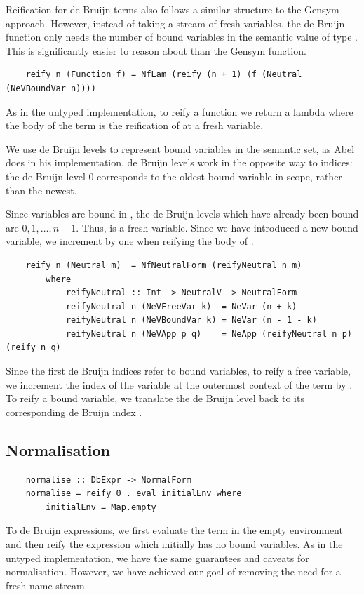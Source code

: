 Reification for de Bruijn terms also follows a similar structure to the Gensym approach. However, instead of taking a stream of fresh variables, the de Bruijn  function only needs the number of bound variables in the semantic value of type . This is significantly easier to reason about than the Gensym  function.

\begin{lstlisting}
    reify n (Function f) = NfLam (reify (n + 1) (f (Neutral (NeVBoundVar n))))
\end{lstlisting}

As in the untyped implementation, to reify a function  we return a lambda where the body of the term is the reification of  at a fresh variable.

We use de Bruijn levels to represent bound variables in the semantic set, as Abel does in his implementation. de Bruijn levels work in the opposite way to indices: the de Bruijn level 0 corresponds to the oldest bound variable in scope, rather than the newest. 

Since  variables are bound in , the de Bruijn levels which have already been bound are $0, 1, \dots, n - 1$. Thus,  is a fresh variable. Since we have introduced a new bound variable, we increment  by one when reifying the body of .

\begin{lstlisting}
    reify n (Neutral m)  = NfNeutralForm (reifyNeutral n m)
        where
            reifyNeutral :: Int -> NeutralV -> NeutralForm
            reifyNeutral n (NeVFreeVar k)  = NeVar (n + k)
            reifyNeutral n (NeVBoundVar k) = NeVar (n - 1 - k)
            reifyNeutral n (NeVApp p q)    = NeApp (reifyNeutral n p) (reify n q)
\end{lstlisting}

Since the first  de Bruijn indices refer to bound variables, to reify a free variable, we increment the index of the variable at the outermost context of the term  by .
To reify a bound variable, we translate the de Bruijn level  back to its corresponding de Bruijn index .

\subsection{Normalisation}

\begin{lstlisting}
    normalise :: DbExpr -> NormalForm
    normalise = reify 0 . eval initialEnv where
        initialEnv = Map.empty  
\end{lstlisting}

To  de Bruijn expressions, we first evaluate the term in the empty environment and then reify the expression which initially has no bound variables. As in the untyped implementation, we have the same guarantees and caveats for normalisation. However, we have achieved our goal of removing the need for a fresh name stream.
